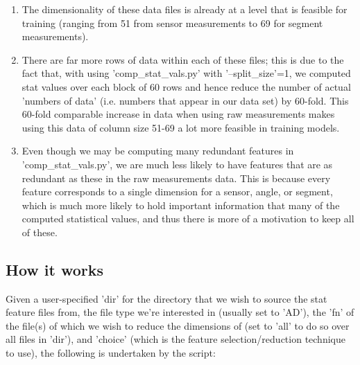\documentclass[12pt,twoside]{report}
\begin{document}
\begin{enumerate}
	\item The dimensionality of these data files is already at a level that is feasible for training (ranging from 51 from sensor measurements to 69 for segment measurements).
	\item There are far more rows of data within each of these files; this is due to the fact that, with using 'comp\_stat\_vals.py' with '--split\_size'=1, we computed stat values over each block of 60 rows and hence reduce the number of actual 'numbers of data' (i.e. numbers that appear in our data set) by 60-fold. This 60-fold comparable increase in data when using raw measurements makes using this data of column size 51-69 a lot more feasible in training models.
	\item Even though we may be computing many redundant features in 'comp\_stat\_vals.py', we are much less likely to have features that are as redundant as these in the raw measurements data. This is because every feature corresponds to a single dimension for a sensor, angle, or segment, which is much more likely to hold important information that many of the computed statistical values, and thus there is more of a motivation to keep all of these.
\end{enumerate}


\subsection{How it works}

\quad Given a user-specified 'dir' for the directory that we wish to source the stat feature files from, the file type we're interested in (usually set to 'AD'), the 'fn' of the file(s) of which we wish to reduce the dimensions of (set to 'all' to do so over all files in 'dir'), and 'choice' (which is the feature selection/reduction technique to use), the following is undertaken by the script:
\end{document}
